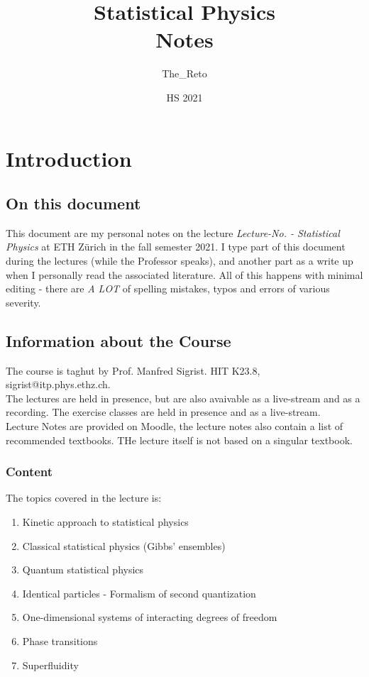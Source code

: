 \documentclass{report}
\title{Statistical Physics  \\
\large Notes}
\author{The\_Reto}
\date{HS 2021}
\begin{document}
\maketitle


\chapter*{Introduction}
\section*{On this document}
This document are my personal notes on the lecture \emph{Lecture-No. - Statistical Physics} at ETH Zürich in the fall semester 2021. 
I type part of this document during the lectures (while the Professor speaks), and another part as a write up when I personally read the associated literature. All of this happens with minimal editing - there are \emph{A LOT} of spelling mistakes, typos and errors of various severity.
\section*{Information about the Course}
The course is taghut by Prof. Manfred Sigrist. HIT K23.8, sigrist@itp.phys.ethz.ch.\\
The lectures are held in presence, but are also avaivable as a live-stream and as a recording. The exercise classes are held in presence and as a live-stream.\\
Lecture Notes are provided on Moodle, the lecture notes also contain a list of recommended textbooks. THe lecture itself is not based on a singular textbook.\\
\subsection*{Content}
The topics covered in the lecture is:
\begin{enumerate}
  \item Kinetic approach to statistical physics
  \item Classical statistical physics (Gibbs' ensembles)
  \item Quantum statistical physics
  \item Identical particles - Formalism of second quantization
  \item One-dimensional systems of interacting degrees of freedom
  \item Phase transitions
  \item Superfluidity
\end{enumerate}
\end{document}
